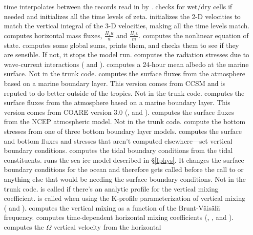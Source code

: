 \begin{klist}
   time interpolates between the records read in by
  .
   checks for wet/dry cells if needed and initializes
  all the time levels of zeta.
   initializes the 2-D velocities to match the
  vertical integral of the 3-D velocities, making all the time levels
  match.
   computes horizontal mass fluxes, $\frac{H_z
  u}{n}$ and $\frac{H_z v}{m}$.
   computes the nonlinear equation of state.
   computes some global sums, prints them, and checks them to
  see if they are sensible. If not, it stops the model run.
   computes the radiation stresses due to
  wave-current interactions (\cite{Mellor_2003} and \cite{Mellor_2005}).
   computes a 24-hour mean albedo at the marine
  surface. Not in the trunk code.
   computes the surface fluxes from the atmosphere
  based on a marine boundary layer. This version comes from CCSM and is
  reputed to do better outside of the tropics. Not in the trunk code.
   computes the surface fluxes from the atmosphere
  based on a marine boundary layer. This version comes from COARE
  version 3.0 (\cite{Fairall_2003}, \cite{Taylor_2001} and
  \cite{Oost_2002}).
   computes the surface fluxes from the NCEP
  atmospheric model. Not in the trunk code.
   compute the bottom stresses from one of three bottom
  boundary layer models.
   computes the surface and bottom fluxes and stresses
  that aren't computed elsewhere---set vertical boundary conditions.
   computes the tidal boundary conditions from the
  tidal constituents.
   runs the sea ice model described in \S\ref{Iphys}. It
  changes the surface boundary conditions for the ocean and therefore
  gets called before the call to  or anything else that
  would be needing the surface boundary conditions. Not in the trunk
  code.
   is called if there's an analytic profile for the
  vertical mixing coefficient.
   is called when using the K-profile parameterization
  of vertical mixing (\cite{Large94} and \cite{Large98}).
   computes the vertical mixing as a function of the
  Brunt-V\"ais\"al\"a frequency.
   computes time-dependent horizontal mixing coefficients
  (\cite{S63}, \cite{Holland_98}, \cite{Webb_98} and \cite{Griffies_2000}).
   computes the $\Omega$ vertical velocity from the horizontal

\end{klist}
